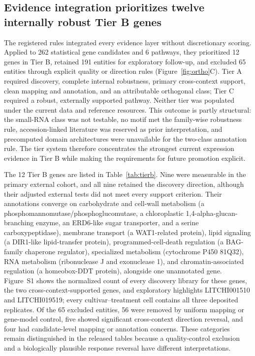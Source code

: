 \documentclass[referee,pdflatex,sn-basic,Numbered]{sn-jnl}
\begin{document}
\subsection{Evidence integration prioritizes twelve internally robust Tier B genes}

The registered rules integrated every evidence layer without discretionary scoring. Applied to 262 statistical gene candidates and 6 pathways, they prioritized 12 genes in Tier B, retained 191 entities for exploratory follow-up, and excluded 65 entities through explicit quality or direction rules (Figure~\ref{fig:ortho}C). Tier A required discovery, complete internal robustness, primary cross-context support, clean mapping and annotation, and an attributable orthogonal class; Tier C required a robust, externally supported pathway. Neither tier was populated under the current data and reference resources. This outcome is partly structural: the small-RNA class was not testable, no motif met the family-wise robustness rule, accession-linked literature was reserved as prior interpretation, and precomputed domain architectures were unavailable for the two-class annotation rule. The tier system therefore concentrates the strongest current expression evidence in Tier B while making the requirements for future promotion explicit.

The 12 Tier B genes are listed in Table~\ref{tab:tierb}. Nine were measurable in the primary external cohort, and all nine retained the discovery direction, although their adjusted external tests did not meet every support criterion. Their annotations converge on carbohydrate and cell-wall metabolism (a phosphomannomutase/phosphoglucomutase, a chloroplastic 1,4-alpha-glucan-branching enzyme, an ERD6-like sugar transporter, and a serine carboxypeptidase), membrane transport (a WAT1-related protein), lipid signaling (a DIR1-like lipid-transfer protein), programmed-cell-death regulation (a BAG-family chaperone regulator), specialized metabolism (cytochrome P450 81Q32), RNA metabolism (ribonuclease J and exonuclease 1), and chromatin-associated regulation (a homeobox-DDT protein), alongside one unannotated gene. Figure~S1 shows the normalized count of every discovery library for these genes, the two cross-context-supported genes, and exploratory highlights LITCHI001510 and LITCHI019519; every cultivar--treatment cell contains all three deposited replicates. Of the 65 excluded entities, 56 were removed by uniform mapping or gene-model control, five showed significant cross-context direction reversal, and four had candidate-level mapping or annotation concerns. These categories remain distinguished in the released tables because a quality-control exclusion and a biologically plausible response reversal have different interpretations.
\end{document}
